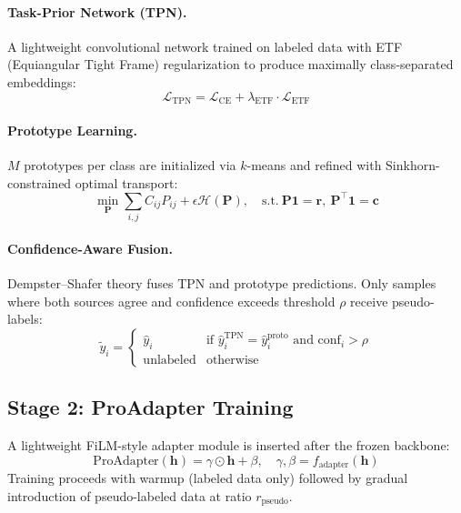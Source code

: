 \documentclass{article}
\newcommand{\mL}{\mathcal{L}}
\newcommand{\mH}{\mathcal{H}}
\begin{document}
\paragraph{Task-Prior Network (TPN).}
A lightweight convolutional network trained on labeled data with ETF (Equiangular Tight Frame) regularization to produce maximally class-separated embeddings:
\begin{equation}
\mL_\text{TPN} = \mL_\text{CE} + \lambda_\text{ETF} \cdot \mL_\text{ETF}
\end{equation}

\paragraph{Prototype Learning.}
$M$ prototypes per class are initialized via $k$-means and refined with Sinkhorn-constrained optimal transport:
\begin{equation}
\min_{\bm{P}} \sum_{i,j} C_{ij} P_{ij} + \epsilon \mH(\bm{P}), \quad \text{s.t.}\ \bm{P}\bm{1} = \bm{r},\ \bm{P}^\top\bm{1} = \bm{c}
\end{equation}

\paragraph{Confidence-Aware Fusion.}
Dempster--Shafer theory fuses TPN and prototype predictions. Only samples where both sources agree and confidence exceeds threshold $\rho$ receive pseudo-labels:
\begin{equation}
\tilde{y}_i = \begin{cases}
\hat{y}_i & \text{if } \hat{y}^\text{TPN}_i = \hat{y}^\text{proto}_i \text{ and } \text{conf}_i > \rho \\
\text{unlabeled} & \text{otherwise}
\end{cases}
\end{equation}

\subsection{Stage 2: ProAdapter Training}

A lightweight FiLM-style adapter module is inserted after the frozen backbone:
\begin{equation}
\text{ProAdapter}(\bm{h}) = \gamma \odot \bm{h} + \beta, \quad \gamma, \beta = f_\text{adapter}(\bm{h})
\end{equation}
Training proceeds with warmup (labeled data only) followed by gradual introduction of pseudo-labeled data at ratio $r_\text{pseudo}$.
\end{document}
